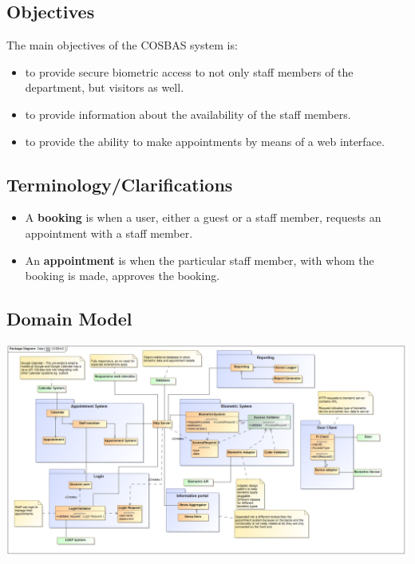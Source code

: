 \documentclass[11pt,a4paper,titlepage]{article}
\begin{document}
	\subsection{Objectives}
	The main objectives of the COSBAS system is:
	\begin{itemize}	
 		\item to provide secure biometric access to not only staff members of the department, but visitors as well.
		\item to provide information about the availability of the staff members.
		\item to provide the ability to make appointments by means of a web interface. 
	\end{itemize}

	\subsection{Terminology/Clarifications}
	\begin{itemize}	
 		\item A \textbf{booking} is when a user, either a guest or a staff member, requests an appointment with a staff member. 
		\item An \textbf{appointment} is when the particular staff member, with whom the booking is made, approves the booking.
	\end{itemize}

\begin{landscape}
	\section{Domain Model}	
	\includegraphics[width=\linewidth]{COSBAS_Domain}
	\end{landscape}
	
		
\end{document}
